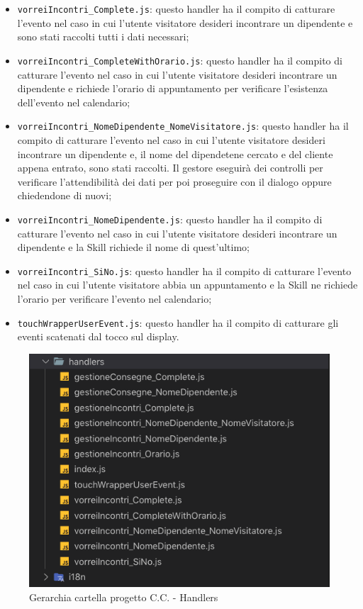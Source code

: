 \begin{itemize}
    \item \texttt{vorreiIncontri\_Complete.js}: questo handler ha il compito di catturare l'evento nel caso in cui l'utente visitatore desideri incontrare un dipendente e sono stati raccolti tutti i dati necessari;
    \item \texttt{vorreiIncontri\_CompleteWithOrario.js}: questo handler ha il compito di catturare l'evento nel caso in cui l'utente visitatore desideri incontrare un dipendente e richiede l'orario di appuntamento per verificare l'esistenza dell'evento nel calendario;
    \item \texttt{vorreiIncontri\_NomeDipendente\_NomeVisitatore.js}: questo handler ha il compito di catturare l'evento nel caso in cui l'utente visitatore desideri incontrare un dipendente e, il nome del dipendetene cercato e del cliente appena entrato, sono stati raccolti. Il gestore eseguirà dei controlli per verificare l'attendibilità dei dati per poi proseguire con il dialogo oppure chiedendone di nuovi;
    \item \texttt{vorreiIncontri\_NomeDipendente.js}: questo handler ha il compito di catturare l'evento nel caso in cui l'utente visitatore desideri incontrare un dipendente e la Skill richiede il nome di quest'ultimo;
    \item \texttt{vorreiIncontri\_SiNo.js}: questo handler ha il compito di catturare l'evento nel caso in cui l'utente visitatore abbia un appuntamento e la Skill ne richiede l'orario per verificare l'evento nel calendario;
    \item \texttt{touchWrapperUserEvent.js}: questo handler ha il compito di catturare gli eventi scatenati dal tocco sul display.
\end{itemize}
\begin{figure}[H]
	\includegraphics[width=13.2cm]{immagini/skill-folder2.png}
	\caption{\label{fig:gerarchia_cartella_cc2}Gerarchia cartella progetto C.C. - Handlers}
\end{figure}

